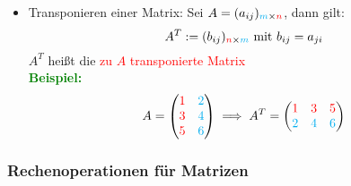 \documentclass{article}
\newcommand{\red}[1]{\textcolor{red}{#1}}
\newcommand{\green}[1]{\textcolor{green}{#1}}
\newcommand{\cyan}[1]{\textcolor{cyan}{#1}}
\newcommand{\ex}{\green{\textbf{Beispiel: }}}
\begin{document}
\begin{itemize}
    \item Transponieren einer Matrix: Sei $A = (a_{ij})_{\cyan{m} \times \red{n}}$, dann gilt:
    \begin{equation*}
        A^T := (b_{ij})_{\red{n} \times \cyan{m}} \text{ mit } b_{ij} = a_{ji} 
    \end{equation*}
    $A^T$ heißt die \red{zu $A$ transponierte Matrix}\\
    \ex \begin{equation*}
        A = \begin{pmatrix}
            \red{1} & \cyan{2}\\
            \red{3} & \cyan{4}\\
            \red{5} & \cyan{6}
        \end{pmatrix}
        \implies
        A^T = 
        \begin{pmatrix}
            \red{1} & \red{3} & \red{5}\\
            \cyan{2} & \cyan{4} & \cyan{6}
        \end{pmatrix}
    \end{equation*}
\end{itemize}

\subsubsection{Rechenoperationen für Matrizen}
\end{document}
